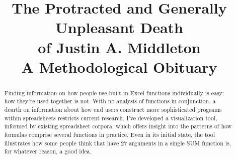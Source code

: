 \documentclass[conference]{IEEEtran}
\begin{document}
\title{The Protracted and Generally Unpleasant Death\\ of Justin A. Middleton\\ \large A Methodological Obituary}


\author{
}






\maketitle

\begin{abstract}
Finding information on how people use built-in Excel functions individually is easy; how they're used together is not. With no analysis of functions in conjunction, a dearth on information about how end users construct more sophisticated programs within spreadsheets restricts current research. I've developed a visualization tool, informed by existing spreadsheet corpora, which offers insight into the patterns of how formulas comprise several functions in practice. Even in its initial state, the tool illustrates how some people think that have 27 arguments in a single SUM function is, for whatever reason, a good idea.
\end{abstract}





%
\IEEEpeerreviewmaketitle
\end{document}
